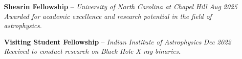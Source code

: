\textbf{Shearin Fellowship} -- \textit{University of North Carolina at Chapel Hill} \hfill \textit{Aug 2025} \\
\textit{Awarded for academic excellence and research potential in the field of astrophysics.}

\vspace{0.5em}

\textbf{Visiting Student Fellowship} -- \textit{Indian Institute of Astrophysics} \hfill \textit{Dec 2022} \\
\textit{Received to conduct research on Black Hole X-ray binaries.}